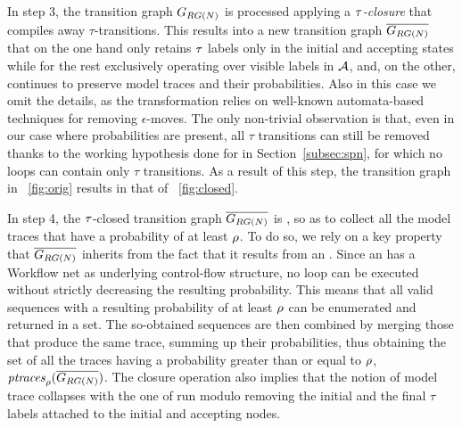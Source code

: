 In step 3, the transition graph $G_{RG(N)}$ is processed applying a \emph{$\tau$-closure} that compiles away
$\tau$-transitions. This results into a new transition graph $\overline{G_{RG(N)}}$ that on the one hand only retains $\tau$ labels only in the initial and accepting states while for the rest exclusively operating over visible labels in $\mathcal{A}$, and, on the other, continues to preserve model traces and their probabilities. Also in this case we omit the details, as the transformation relies on well-known automata-based techniques for removing $\epsilon$-moves. The only non-trivial observation is that, even in our case where probabilities are present, all $\tau$ transitions can still be removed thanks to the working hypothesis done for  in Section~\ref{subsec:spn}, for which no loops can contain only $\tau$ transitions. As a result of this step, the transition graph in \figurename~\ref{fig:orig} results in that of \figurename~\ref{fig:closed}.


In step 4, the $\tau$-closed transition graph $\overline{G_{RG(N)}}$ is \unravelled, so as to collect all the model traces that have a probability of at least $\rho$. To do so, we rely on a key property that $\overline{G_{RG(N)}}$ inherits from the fact that it results from an \uswn. Since an \uswn has a Workflow net as underlying control-flow structure, no loop can be executed without strictly decreasing the resulting probability. This means that all valid sequences with a resulting probability of at least $\rho$ can be enumerated and returned in a set. The so-obtained sequences are then combined by merging those that produce the same trace, summing up their probabilities, thus obtaining the set of all the traces having a probability greater than or equal to $\rho$, $\mathit{ptraces}_{\rho}(\overline{G_{RG(N)}})$. The closure operation also implies that the notion of model trace collapses with the one of run modulo removing the initial and the final $\tau$ labels attached to the initial and accepting nodes.


